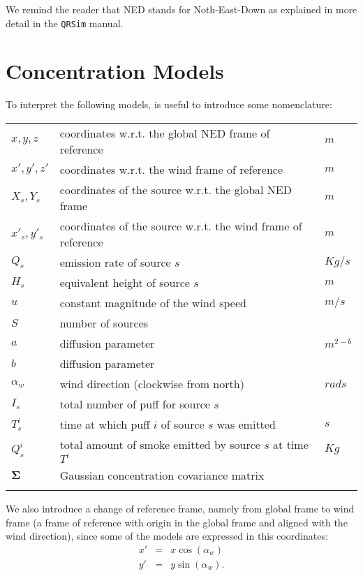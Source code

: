 \documentclass[a4paper,11pt]{report}
\begin{document}
We remind the reader that NED stands for Noth-East-Down as explained in more detail in the \texttt{QRSim} manual.

\chapter{Concentration Models}

To interpret the following models, is useful to introduce some nomenclature:
\begin{longtable}{l l l}
$x,y,z$ & coordinates w.r.t. the global NED frame of reference & $m$\\
$x',y',z'$ & coordinates w.r.t. the wind frame of reference & $m$\\
$X_s,Y_s$ & coordinates of the source w.r.t. the global NED frame  & $m$\\
$x\prime_s,y'_s$ & coordinates of the source w.r.t. the wind frame of reference  & $m$\\
$Q_s$ & emission rate of source $s$ & $Kg/s$\\
$H_s$ & equivalent height of source $s$ & $m$\\
$u$ & constant magnitude of the wind speed & $m/s$\\
$S$ & number of sources & \\
$a$ & diffusion parameter & $m^{2-b}$\\
$b$ & diffusion parameter & \\
$\alpha_w$ & wind direction (clockwise from north) & $rads$\\
$I_s$ & total number of puff for source $s$ & \\
$T^i_s$ & time at which puff $i$ of source $s$ was emitted & $s$\\
$Q^i_s$ & total amount of smoke emitted by source $s$ at time $T^i$ & $Kg$\\
$\boldsymbol\Sigma$ & Gaussian concentration covariance matrix \\
\label{tab:naming2}
\end{longtable}

We also introduce a change of reference frame, namely from global frame to wind frame (a frame of reference with origin in the global frame and aligned with the wind direction), since some of the models are expressed in this coordinates:
\begin{eqnarray}
x' &=& x \cos(\alpha_w) \\
y' &=& y \sin(\alpha_w).
\end{eqnarray}
\end{document}
